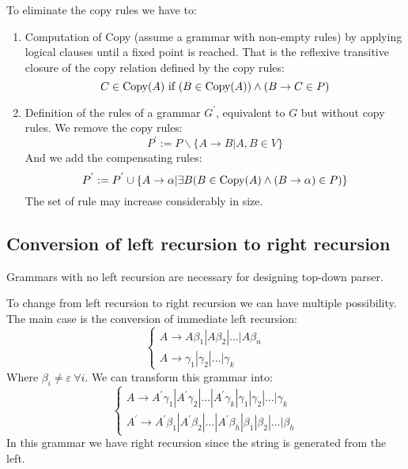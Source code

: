 To eliminate the copy rules we have to: 
\begin{enumerate}
    \item Computation of Copy (assume a grammar with non-empty rules) by applying logical clauses until a fixed point is reached. 
        That is the reflexive transitive closure of the copy relation defined by the copy rules: 
        \[C \in \textnormal{Copy}(A) \textnormal{ if } (B \in \textnormal{Copy}(A)) \land (B \rightarrow C \in P)\]
    \item Definition of the rules of a grammar $G^{'}$, equivalent to $G$ but without copy rules.
        We remove the copy rules: 
        \[P^{'}:=P \backslash \{A \rightarrow B|A,B \in V\}\]
        And we add the compensating rules: 
        \[P^{'}:=P^{'}\cup\{A \rightarrow \alpha|\exists B (B \in \textnormal{Copy}(A) \land (B \rightarrow \alpha) \in P)\}\]
        The set of rule may increase considerably in size. 
\end{enumerate}

\subsection*{Conversion of left recursion to right recursion}
Grammars with no left recursion are necessary for designing top-down parser. 

To change from left recursion to right recursion we can have multiple possibility. 
The main case is the conversion of immediate left recursion: 
\[
\begin{cases}
    A \rightarrow A\beta_1|A\beta_2|\dots|A\beta_n \\
    A \rightarrow \gamma_1|\gamma_2|\dots|\gamma_k
\end{cases}    
\]
Where $\beta_i \neq \varepsilon \: \forall i$. We can transform this grammar into: 
\[
\begin{cases}
    A \rightarrow A^{'}\gamma_1|A^{'}\gamma_2|\dots|A^{'}\gamma_k|\gamma_1|\gamma_2|\dots|\gamma_k  \\
    A^{'} \rightarrow A^{'}\beta_1|A^{'}\beta_2|\dots|A^{'}\beta_h|\beta_1|\beta_2|\dots|\beta_h
\end{cases}    
\]
In this grammar we have right recursion since the string is generated from the left. 

